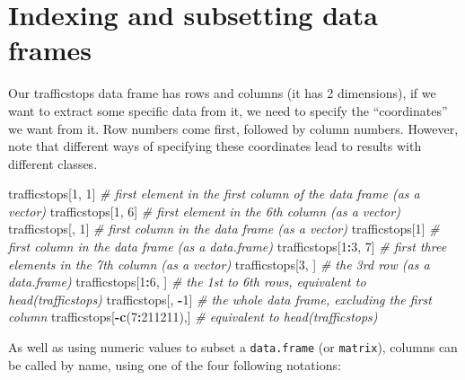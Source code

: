 \documentclass[]{book}
\newenvironment{Shaded}{\begin{snugshade}}{\end{snugshade}}
\newcommand{\KeywordTok}[1]{\textcolor[rgb]{0.13,0.29,0.53}{\textbf{#1}}}
\newcommand{\DecValTok}[1]{\textcolor[rgb]{0.00,0.00,0.81}{#1}}
\newcommand{\StringTok}[1]{\textcolor[rgb]{0.31,0.60,0.02}{#1}}
\newcommand{\CommentTok}[1]{\textcolor[rgb]{0.56,0.35,0.01}{\textit{#1}}}
\newcommand{\OperatorTok}[1]{\textcolor[rgb]{0.81,0.36,0.00}{\textbf{#1}}}
\newcommand{\NormalTok}[1]{#1}
\begin{document}
\section{Indexing and subsetting data
frames}\label{indexing-and-subsetting-data-frames}

Our trafficstops data frame has rows and columns (it has 2 dimensions),
if we want to extract some specific data from it, we need to specify the
``coordinates'' we want from it. Row numbers come first, followed by
column numbers. However, note that different ways of specifying these
coordinates lead to results with different classes.

\begin{Shaded}
\begin{Highlighting}[]
\NormalTok{trafficstops[}\DecValTok{1}\NormalTok{, }\DecValTok{1}\NormalTok{]   }\CommentTok{# first element in the first column of the data frame (as a vector)}
\NormalTok{trafficstops[}\DecValTok{1}\NormalTok{, }\DecValTok{6}\NormalTok{]   }\CommentTok{# first element in the 6th column (as a vector)}
\NormalTok{trafficstops[, }\DecValTok{1}\NormalTok{]    }\CommentTok{# first column in the data frame (as a vector)}
\NormalTok{trafficstops[}\DecValTok{1}\NormalTok{]      }\CommentTok{# first column in the data frame (as a data.frame)}
\NormalTok{trafficstops[}\DecValTok{1}\OperatorTok{:}\DecValTok{3}\NormalTok{, }\DecValTok{7}\NormalTok{] }\CommentTok{# first three elements in the 7th column (as a vector)}
\NormalTok{trafficstops[}\DecValTok{3}\NormalTok{, ]    }\CommentTok{# the 3rd row (as a data.frame)}
\NormalTok{trafficstops[}\DecValTok{1}\OperatorTok{:}\DecValTok{6}\NormalTok{, ]  }\CommentTok{# the 1st to 6th rows, equivalent to head(trafficstops)}
\NormalTok{trafficstops[, }\OperatorTok{-}\DecValTok{1}\NormalTok{]           }\CommentTok{# the whole data frame, excluding the first column}
\NormalTok{trafficstops[}\OperatorTok{-}\KeywordTok{c}\NormalTok{(}\DecValTok{7}\OperatorTok{:}\DecValTok{211211}\NormalTok{),]  }\CommentTok{# equivalent to head(trafficstops)}
\end{Highlighting}
\end{Shaded}

As well as using numeric values to subset a \texttt{data.frame} (or
\texttt{matrix}), columns can be called by name, using one of the four
following notations:

\begin{Shaded}
\end{Shaded}
\end{document}
